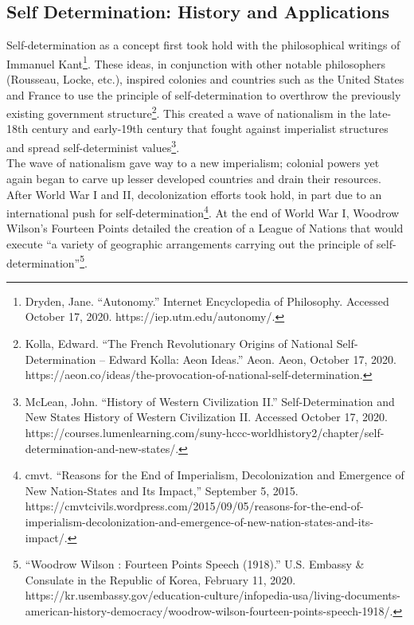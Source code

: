 \documentclass[10pt, letterpaper]{article}
\begin{document}
\subsection{{Self Determination: History and Applications}}

Self-determination as a concept first took hold with the philosophical
writings of Immanuel Kant\footnote{Dryden, Jane. ``Autonomy.'' Internet
  Encyclopedia of Philosophy. Accessed October 17, 2020.
  https://iep.utm.edu/autonomy/.}. These ideas, in conjunction with
other notable philosophers (Rousseau, Locke, etc.), inspired colonies
and countries such as the United States and France to use the principle
of self-determination to overthrow the previously existing government
structure\footnote{Kolla, Edward. ``The French Revolutionary Origins of
  National Self-Determination -- Edward Kolla: Aeon Ideas.'' Aeon. Aeon,
  October 17, 2020.
  https://aeon.co/ideas/the-provocation-of-national-self-determination.}.
This created a wave of nationalism in the late-18th century and
early-19th century that fought against imperialist structures and spread
self-determinist values\footnote{McLean, John. ``History of Western
  Civilization II.'' Self-Determination and New States \textbar{}
  History of Western Civilization II. Accessed October 17, 2020.
  https://courses.lumenlearning.com/suny-hccc-worldhistory2/chapter/self-determination-and-new-states/.}.\\


The wave of nationalism gave way to a new imperialism; colonial powers
yet again began to carve up lesser developed countries and drain their
resources. After World War I and II, decolonization efforts took hold,
in part due to an international push for self-determination\footnote{cmvt.
  ``Reasons for the End of Imperialism, Decolonization and Emergence of
  New Nation-States and Its Impact,'' September 5, 2015.
  https://cmvtcivils.wordpress.com/2015/09/05/reasons-for-the-end-of-imperialism-decolonization-and-emergence-of-new-nation-states-and-its-impact/.}.
At the end of World War I, Woodrow Wilson's Fourteen Points detailed the
creation of a League of Nations that would execute ``a variety of
geographic arrangements carrying out the principle of
self-determination''\footnote{``Woodrow Wilson : Fourteen Points Speech
  (1918).'' U.S. Embassy \& Consulate in the Republic of Korea, February
  11, 2020.
  https://kr.usembassy.gov/education-culture/infopedia-usa/living-documents-american-history-democracy/woodrow-wilson-fourteen-points-speech-1918/.}.\\
\end{document}
